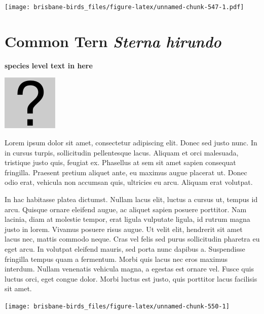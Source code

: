 \documentclass[]{book}
\let\origfigure\figure
\let\endorigfigure\endfigure
\renewenvironment{figure}[1][2] {
  \expandafter\origfigure\expandafter[H]
} {
  \endorigfigure
}
\begin{document}
\begin{figure}
\centering
\texttt{[image: brisbane-birds\_files/figure-latex/unnamed-chunk-547-1.pdf]}
\caption{\label{fig:unnamed-chunk-547}insert figure caption}
\end{figure}

\section{\texorpdfstring{Common Tern \emph{Sterna
hirundo}}{Common Tern Sterna hirundo}}\label{common-tern-sterna-hirundo}

\textbf{species level text in here}

\begin{figure}
\centering
\includegraphics{assets/missing.png}
\caption{No image for species}
\end{figure}

Lorem ipsum dolor sit amet, consectetur adipiscing elit. Donec sed justo
nunc. In in cursus turpis, sollicitudin pellentesque lacus. Aliquam et
orci malesuada, tristique justo quis, feugiat ex. Phasellus at sem sit
amet sapien consequat fringilla. Praesent pretium aliquet ante, eu
maximus augue placerat ut. Donec odio erat, vehicula non accumsan quis,
ultricies eu arcu. Aliquam erat volutpat.

In hac habitasse platea dictumst. Nullam lacus elit, luctus a cursus ut,
tempus id arcu. Quisque ornare eleifend augue, ac aliquet sapien posuere
porttitor. Nam lacinia, diam at molestie tempor, erat ligula vulputate
ligula, id rutrum magna justo in lorem. Vivamus posuere risus augue. Ut
velit elit, hendrerit sit amet lacus nec, mattis commodo neque. Cras vel
felis sed purus sollicitudin pharetra eu eget arcu. In volutpat eleifend
mauris, sed porta nunc dapibus a. Suspendisse fringilla tempus quam a
fermentum. Morbi quis lacus nec eros maximus interdum. Nullam venenatis
vehicula magna, a egestas est ornare vel. Fusce quis luctus orci, eget
congue dolor. Morbi luctus est justo, quis porttitor lacus facilisis sit
amet.

\begin{figure}
\texttt{[image: brisbane-birds\_files/figure-latex/unnamed-chunk-550-1]} \caption{insert figure caption}\label{fig:unnamed-chunk-550}
\end{figure}
\end{document}
